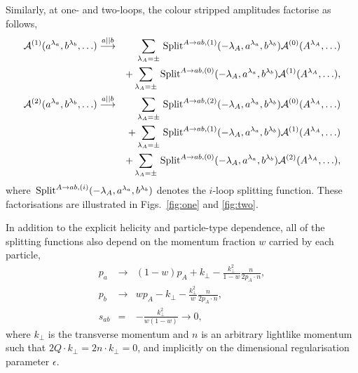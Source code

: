 \documentclass[paper,notoc,nohyper]{JHEP3}
\def\Split{\, {\rm Split}}
\begin{document}
Similarly, at one- and two-loops, the colour stripped amplitudes factorise as follows,
\begin{eqnarray}
\label{eq:onecol}
{\cal A}^{(1)}(a^{\lambda_a},b^{\lambda_b},\ldots) &\stackrel{a||b}{\longrightarrow}& 
\phantom{+}\sum_{\lambda_A=\pm}\Split^{A \to ab,(1)}({-\lambda_A},a^{\lambda_a},b^{\lambda_b})
{\cal A}^{(0)}(A^{\lambda_A},\ldots)\nonumber\\
&&+\sum_{\lambda_A=\pm}\Split^{A \to ab,(0)}({-\lambda_A},a^{\lambda_a},b^{\lambda_b}) 
{\cal A}^{(1)}(A^{\lambda_A},\ldots),\\
{\cal A}^{(2)}(a^{\lambda_a},b^{\lambda_b},\ldots) &\stackrel{a||b}{\longrightarrow}& 
\label{eq:twocol}
\phantom{+}\sum_{\lambda_A=\pm}\Split^{A \to ab,(2)}({-\lambda_A},a^{\lambda_a},b^{\lambda_b}) 
{\cal A}^{(0)}(A^{\lambda_A},\ldots)\nonumber\\
&&+\sum_{\lambda_A=\pm}\Split^{A \to ab,(1)}({-\lambda_A},a^{\lambda_a},b^{\lambda_b})
{\cal A}^{(1)}(A^{\lambda_A},\ldots)\nonumber \\
&&+\sum_{\lambda_A=\pm}\Split^{A \to ab,(0)}({-\lambda_A},a^{\lambda_a},b^{\lambda_b})
{\cal A}^{(2)}(A^{\lambda_A},\ldots),
\end{eqnarray}
where $\Split^{A \to ab,(i)}({-\lambda_A},a^{\lambda_a},b^{\lambda_b})$ denotes the $i$-loop 
splitting function.  These factorisations are illustrated in Figs.~\ref{fig:one} and \ref{fig:two}.

In addition to the explicit helicity and particle-type dependence, 
all of the splitting functions also depend on 
the momentum fraction $w$ carried by each particle,
\begin{eqnarray}
\label{eq:colmom}
p_a &\to& (1-w) p_A+k_\perp-\frac{k_\perp^2}{1-w}\frac{n}{ 2p_A\cdot n}, \nonumber \\
p_b &\to& w p_A-k_\perp-\frac{k_\perp^2}{w}\frac{n}{ 2p_A\cdot n}, \nonumber \\
s_{ab} &=& -\frac{k_\perp^2}{w(1-w)}\to 0,
\end{eqnarray}
where $k_\perp$ is the transverse momentum and 
$n$ is an arbitrary lightlike momentum such that
$2Q\cdot k_\perp = 2 n\cdot k_\perp = 0$,
and implicitly on the dimensional regularisation parameter $\epsilon$.

\end{document}
